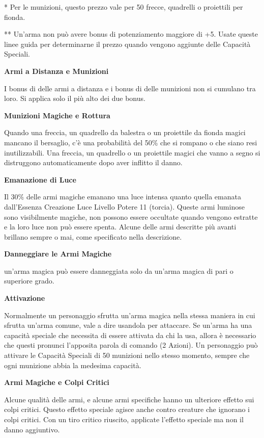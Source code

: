 \documentclass[a4paper,11pt,twoside,openany]{book}
\begin{document}
{\begin{tabular}{ll}
\end{tabular}

{*} Per le munizioni, questo prezzo vale per 50 frecce, quadrelli o proiettili per fionda.

{*}{*} Un'arma non può avere bonus di potenziamento maggiore di +5. Usate queste linee guida per determinarne il prezzo quando vengono aggiunte delle Capacità Speciali.

\bigskip

\textbf{Armi a Distanza e Munizioni}

I bonus di delle armi a distanza e i bonus di delle munizioni non si cumulano tra loro. Si applica solo il più alto dei due bonus.

\textbf{Munizioni Magiche e Rottura}

Quando una freccia, un quadrello da balestra o un proiettile da fionda magici mancano il bersaglio, c'è una probabilità del 50\% che si rompano o che siano resi inutilizzabili. Una freccia, un quadrello o un proiettile magici che vanno a segno si distruggono automaticamente dopo aver inflitto il danno.

\textbf{Emanazione di Luce}

Il 30\% delle armi magiche emanano una luce intensa quanto quella emanata dall'Essenza Creazione Luce Livello Potere 11 (torcia). Queste armi luminose sono visibilmente magiche, non possono essere occultate quando vengono estratte e la loro luce non può essere spenta. Alcune delle armi descritte più avanti brillano sempre o mai, come specificato nella descrizione.

\textbf{Danneggiare le Armi Magiche}

un'arma magica può essere danneggiata solo da un'arma magica di pari o superiore grado.

\textbf{Attivazione}

Normalmente un personaggio sfrutta un'arma magica nella stessa maniera in cui sfrutta un'arma comune, vale a dire usandola per attaccare. Se un'arma ha una capacità speciale che necessita di essere attivata da chi la usa, allora è necessario che questi pronunci l'apposita parola di comando (2 Azioni). Un personaggio può attivare le Capacità Speciali di 50 munizioni nello stesso momento, sempre che ogni munizione abbia la medesima capacità.

\textbf{Armi Magiche e Colpi Critici}

Alcune qualità delle armi, e alcune armi specifiche hanno un ulteriore effetto sui colpi critici. Questo effetto speciale agisce anche contro creature che ignorano i colpi critici. Con un tiro critico riuscito, applicate l'effetto speciale ma non il danno aggiuntivo.

}
\end{document}
